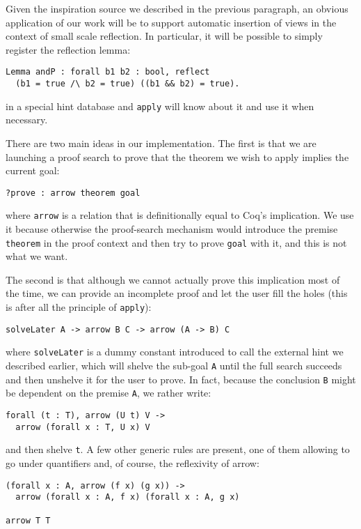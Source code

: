 \documentclass[nocopyrightspace,blockstyle,numbers]{sigplanconf}
\begin{document}
Given the inspiration source we described in the previous paragraph,
an obvious application of our work will be to support automatic
insertion of views in the context of small scale reflection. In
particular, it will be possible to simply register the reflection
lemma:

\begin{verbatim}
Lemma andP : forall b1 b2 : bool, reflect
  (b1 = true /\ b2 = true) ((b1 && b2) = true).
\end{verbatim}
in a special hint database and \texttt{apply} will know about it
and use it when necessary.

There are two main ideas in our implementation. The first is that
we are launching a proof search to prove that the theorem
we wish to apply implies the current goal:

\begin{verbatim}
?prove : arrow theorem goal
\end{verbatim}
where \texttt{arrow} is a relation that is definitionally equal to Coq's implication.
We use it because otherwise the proof-search mechanism would introduce
the premise \texttt{theorem} in the proof context and then try
to prove \texttt{goal} with it, and this is not what we want.

The second is that although we cannot actually prove this implication
most of the time, we can provide an incomplete proof and let the
user fill the holes (this is after all the principle of
\texttt{apply}):

\begin{verbatim}
solveLater A -> arrow B C -> arrow (A -> B) C
\end{verbatim}
where \texttt{solveLater} is a dummy constant introduced to call the
external hint we described earlier, which will shelve the sub-goal
\texttt{A} until the full search succeeds and then unshelve it for the
user to prove. In fact, because the conclusion \texttt{B} might be
dependent on the premise \texttt{A}, we rather write:

\begin{verbatim}
forall (t : T), arrow (U t) V ->
  arrow (forall x : T, U x) V
\end{verbatim}
and then shelve \texttt{t}.
A few other generic rules are present, one of them allowing to
go under quantifiers and, of course, the reflexivity of arrow:

\begin{verbatim}
(forall x : A, arrow (f x) (g x)) ->
  arrow (forall x : A, f x) (forall x : A, g x)

arrow T T
\end{verbatim}
\end{document}
